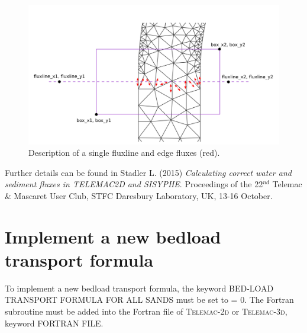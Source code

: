 \begin{figure}[H]
\begin{center}
\includegraphics[scale=0.25,angle=0]{graphics/fluxline_example.png}
\caption{Description of a single fluxline and edge fluxes (red).}\label{fig:fluxline_example}
\end{center}
\end{figure}

Further details can be found in Stadler L. (2015) \textit{Calculating correct water and sediment fluxes in TELEMAC2D and SISYPHE}. Proceedings of the 22$^{nd}$
Telemac \& Mascaret User Club, STFC Daresbury Laboratory, UK, 13-16 October.

\section{Implement a new bedload transport formula}
To implement a new bedload transport formula, the keyword {\ttfamily BED-LOAD TRANSPORT FORMULA FOR ALL SANDS} must be set to {\ttfamily = 0}. The Fortran subroutine must be added into the Fortran file of \textsc{Telemac-2d} or \textsc{Telemac-3d}, keyword {\ttfamily FORTRAN FILE}.

